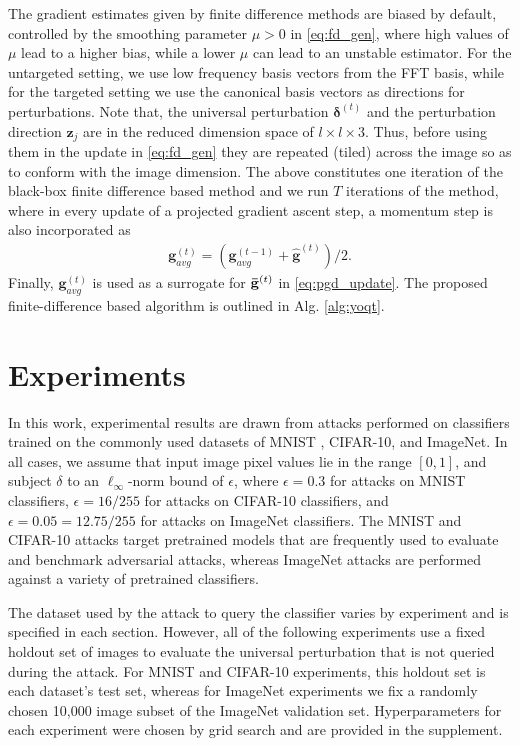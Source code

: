 \documentclass[letterpaper]{article}
\begin{document}
	
	The gradient estimates given by finite difference methods are biased by default, controlled by the smoothing parameter \mbox{$\mu > 0$} in \eqref{eq:fd_gen}, where high values of  $\mu$ lead to a higher bias, while a lower $\mu$ can lead to an unstable estimator. 
	For the untargeted setting, we use low frequency basis vectors from the FFT basis, while for the targeted setting we use the canonical basis vectors as directions for perturbations.
	Note that, the universal perturbation $\bm{\delta}^{(t)}$ and the perturbation direction $\mathbf{z}_j$ are in the reduced dimension space of $l\times l\times 3$. Thus, before using them in the update in \eqref{eq:fd_gen} they are repeated (tiled) across the image so as to conform with the image dimension. 
	The above constitutes one iteration of the black-box finite difference based method and we run $T$ iterations of the method, where in every update of a projected gradient ascent step,  a momentum step is also incorporated as 
	\begin{align*}
	\mathbf{g}_{avg}^{(t)} = (\mathbf{g}_{avg}^{(t-1)} + \widehat{\mathbf{g}}^{(t)})/2.
	\end{align*}
	Finally, $\mathbf{g}_{avg}^{(t)}$ is used as a surrogate for $\mathbf{\Bar{g}}^{(t)}$ in \eqref{eq:pgd_update}. The proposed finite-difference based algorithm is outlined in Alg. \ref{alg:yoqt}.
	
	
	\section{Experiments}
	
	In this work, experimental results are drawn from attacks performed on classifiers trained on the commonly used datasets of MNIST \cite{mnist}, CIFAR-10\cite{cifar}, and ImageNet\cite{imagenet}. In all cases, we assume that input image pixel values lie in the range $[0,1]$, and subject $\delta$ to an $\ell_\infty$-norm bound of $\epsilon$, where $\epsilon = 0.3$ for attacks on MNIST classifiers, $\epsilon = 16/255$ for attacks on CIFAR-10 classifiers, and $\epsilon = 0.05 = 12.75/255$ for attacks on ImageNet classifiers. The MNIST and CIFAR-10 attacks target pretrained models that are frequently used to evaluate and benchmark adversarial attacks, whereas ImageNet attacks are performed against a variety of pretrained classifiers.
	
	The dataset used by the attack to query the classifier varies by experiment and is specified in each section. However, all of the following experiments use a fixed holdout set of images to evaluate the universal perturbation that is not queried during the attack. For MNIST and CIFAR-10 experiments, this holdout set is each dataset's test set, whereas for ImageNet experiments we fix a randomly chosen 10,000 image subset of the ImageNet validation set. Hyperparameters for each experiment were chosen by grid search and are provided in the supplement.
	
\end{document}
